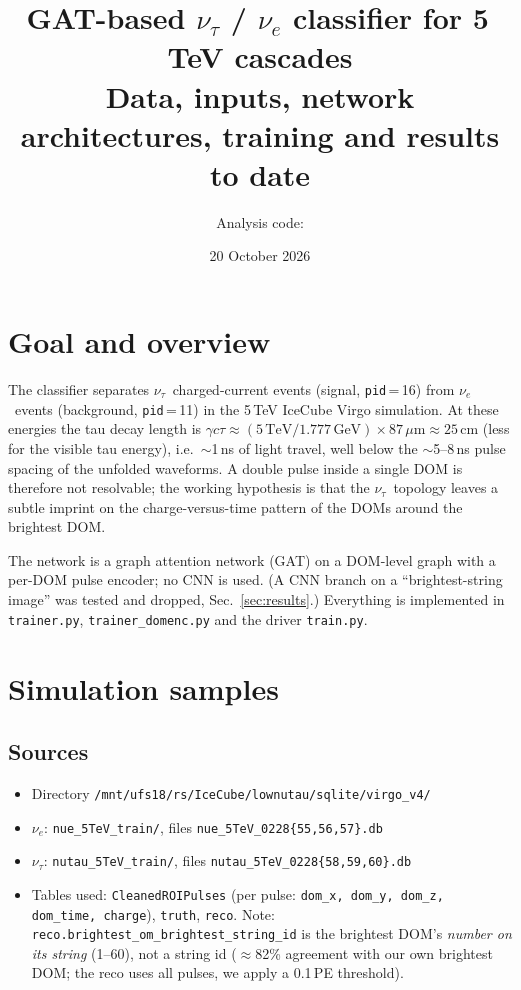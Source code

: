 \documentclass[11pt,a4paper]{article}
\title{GAT-based $\nu_\tau$ / $\nu_e$ classifier for 5\,TeV cascades\\[2pt]
\large Data, inputs, network architectures, training and results to date}
\author{Analysis code: \code{doublepulse/gnn/Analysis}}
\date{20 October 2026}
\newcommand{\nutau}{\ensuremath{\nu_\tau}}
\newcommand{\nue}{\ensuremath{\nu_e}}
\newcommand{\code}[1]{\texttt{#1}}
\begin{document}
\sloppy
\maketitle
\tableofcontents

\section{Goal and overview}
The classifier separates \nutau\ charged-current events (signal, \code{pid}\,=\,16) from \nue\ events
(background, \code{pid}\,=\,11) in the 5\,TeV IceCube Virgo simulation. At these energies the tau decay length is
$\gamma c\tau \approx (5\,\mathrm{TeV}/1.777\,\mathrm{GeV})\times 87\,\mu\mathrm{m}\approx 25$\,cm (less for the
visible tau energy), i.e.\ $\sim$1\,ns of light travel, well below the $\sim$5--8\,ns pulse spacing of the unfolded
waveforms. A double pulse inside a single DOM is therefore not resolvable; the working hypothesis is that the
\nutau\ topology leaves a subtle imprint on the charge-versus-time pattern of the DOMs around the brightest DOM.

The network is a graph attention network (GAT) on a DOM-level graph with a per-DOM pulse encoder; no CNN is used.
(A CNN branch on a ``brightest-string image'' was tested and dropped, Sec.~\ref{sec:results}.) Everything is
implemented in \code{trainer.py}, \code{trainer\_domenc.py} and the driver \code{train.py}.

\section{Simulation samples}
\subsection{Sources}
\begin{itemize}
  \item Directory \code{/mnt/ufs18/rs/IceCube/lownutau/sqlite/virgo\_v4/}
  \item \nue: \code{nue\_5TeV\_train/}, files \code{nue\_5TeV\_0228\{55,56,57\}.db}
  \item \nutau: \code{nutau\_5TeV\_train/}, files \code{nutau\_5TeV\_0228\{58,59,60\}.db}
  \item Tables used: \code{CleanedROIPulses} (per pulse: \code{dom\_x, dom\_y, dom\_z, dom\_time, charge}),
        \code{truth}, \code{reco}. Note: \code{reco.brightest\_om\_brightest\_string\_id} is the brightest DOM's
        \emph{number on its string} (1--60), not a string id ($\approx$82\% agreement with our own brightest DOM; the
        reco uses all pulses, we apply a 0.1\,PE threshold).
\end{itemize}
\end{document}
